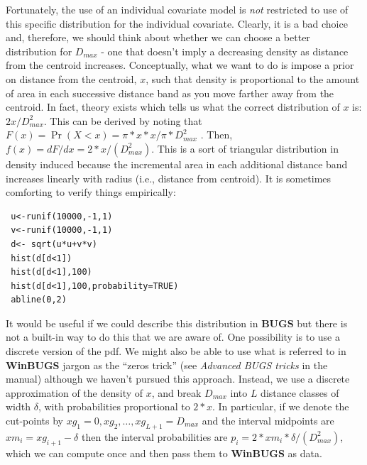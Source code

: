 Fortunately, the use of an individual covariate model is {\it not} restricted to
use of this specific distribution for the individual
covariate. Clearly, it is a bad choice and, therefore, we should think
about whether we can choose a better distribution for $D_{max}$ - one that
doesn't imply a decreasing density as distance from the centroid
increases.  Conceptually, what we want to do is impose a prior on
distance from the centroid, $x$, such that density is proportional to
the amount of area in each successive distance band as you move
farther away from the centroid.  In fact, theory exists
which tells us what the correct distribution of $x$ is: 
$2x/D_{max}^2$. This can be derived by noting that $F(x) = \Pr(X<x) =
\pi*x*x/\pi*D_{max}^{2}$ . Then, $f(x) = dF/dx =
2*x/(D_{max}^{2})$. This is a sort of triangular distribution in
density
induced because the incremental area in each additional distance band
increases linearly with radius (i.e., distance from centroid). It is
sometimes comforting to verify things empirically:
{\small
\begin{verbatim}
 u<-runif(10000,-1,1)
 v<-runif(10000,-1,1)
 d<- sqrt(u*u+v*v)
 hist(d[d<1])
 hist(d[d<1],100)
 hist(d[d<1],100,probability=TRUE)
 abline(0,2)
\end{verbatim}
}

It would be useful if we could describe this distribution in {\bf
  BUGS} but there is not a built-in way to do this that we are aware
of.  One possibility is to use a discrete version of the pdf. We might
also be able to use what is referred to in {\bf WinBUGS} jargon as the
``zeros trick'' (see {\it Advanced BUGS tricks} in the manual)
although we haven't pursued this approach. Instead, we use a discrete
approximation of the density of $x$, and break $D_{max}$ into $L$
distance classes of width $\delta$, with probabilities proportional to
$2*x$. In particular, if we denote the cut-points by $xg_{1}=0,xg_{2},
\ldots, xg_{L+1}=D_{max}$ and the interval midpoints are $xm_{i} =
xg_{i+1}-\delta$ then the interval probabilities are $p_{i} =
2*xm_{i}*\delta/(D_{max}^{2})$, which we can compute once and then
pass them to {\bf WinBUGS} as data.

